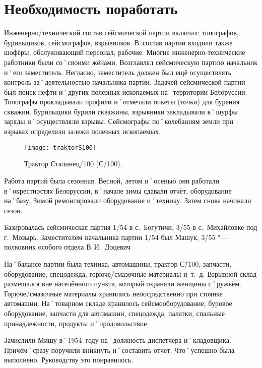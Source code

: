 ﻿\chapter{Необходимость поработать}

Инженерно\-/технический состав сейсмической партии включал: топографов, бурильщиков, сейсмографов, взрывников. В~состав партии входили также шофёры, обслуживающий персонал, рабочие. Многие инженерно-технические работники были со˚своими жёнами. Возглавлял сейсмическую партию начальник и˚его заместитель. Негласно, заместитель должен был ещё осуществлять контроль за˚деятельностью начальника партии. Задачей сейсмической партии был поиск нефти и˚других полезных ископаемых на˚территории Белоруссии. Топографы прокладывали профили и˚отмечали пикеты (точки) для бурения скважин. Бурильщики бурили скважины, взрывники закладывали в˚шурфы заряды и˚осуществляли взрывы. Сейсмографы по˚колебаниям земли при взрывах определяли залежи полезных ископаемых.

\begin{wrapfigure}{O}{.4\textwidth}
\centering
\texttt{[image: traktorS100]}
\caption[Трактор Сталинец\=/100 (С\=/100).]{Трактор Сталинец\=/100 (С\=/100)\footnotemark.}
\label{fig:traktorS100}
\end{wrapfigure}

Работа партий была сезонная. Весной, летом и˚осенью они работали в˚окрестностях Белоруссии, в˚начале зимы сдавали отчёт, оборудование на˚базу. Зимой ремонтировали оборудование и˚технику. Затем снова начинали сезон.

Базировалась сейсмическая партия 1/54 в с.~Богутичи, 3/55 в с.~Михайловке под г.~Мозырь. Заместителем начальника партии 1/54 был Машук, 3/55 "--- полковник особого отдела В.\,И.~Доцевич

На˚балансе партии была техника, автомашины, трактор С\=/100, запчасти, оборудование, спецодежда, горюче\-/смазочные материалы и~т.~д. Взрывной склад размещался вне населённого пункта, который охраняли женщины с˚ружьём. Горюче\-/смазочные материалы хранились непосредственно при стоянке автомашин. На˚товарном складе хранилось сейсмооборудование, буровое оборудование, запчасти для автомашин, спецодежда, палатки, спальные принадлежности, продукты и˚продовольствие.

Зачислили Мишу в˚1954~году на˚должность диспетчера и˚кладовщика. Причём˚сразу поручили вникнуть и˚составить отчёт. Что˚успешно была выполнено. Руководству это понравилось.

